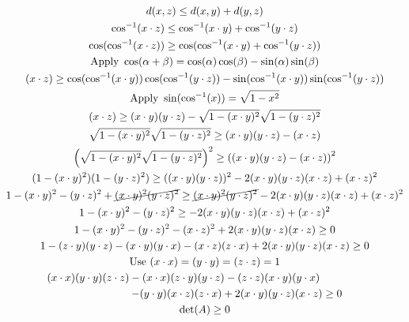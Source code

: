 \documentclass{jhwhw}
\begin{document}
\begin{gather}
d(x,z)\le d(x,y)+d(y,z)\\
\cos^{-1}(x\cdot z) \le \cos^{-1}(x\cdot y) + \cos^{-1}(y\cdot z)\\
\cos(\cos^{-1}(x\cdot z)) \ge \cos(\cos^{-1}(x\cdot y) + \cos^{-1}(y\cdot z))\\
\text{Apply } \cos(\alpha+\beta) = \cos(\alpha)\cos(\beta)-\sin(\alpha)\sin(\beta)\\
(x\cdot z) \ge \cos(\cos^{-1}(x\cdot y))\cos(\cos^{-1}(y\cdot z))-\sin(\cos^{-1}(x\cdot y))\sin(\cos^{-1}(y\cdot z))\\
\text{Apply } \sin(\cos^{-1}(x)) = \sqrt{ 1 -x^2}\\
(x\cdot z) \ge (x\cdot y)(y\cdot z)-\sqrt{ 1 -(x\cdot y)^2}\sqrt{ 1 -(y\cdot z)^2}\\
\sqrt{ 1 -(x\cdot y)^2}\sqrt{ 1 -(y\cdot z)^2} \ge (x\cdot y)(y\cdot z)-(x\cdot z)\\
\left(\sqrt{ 1 -(x\cdot y)^2}\sqrt{ 1 -(y\cdot z)^2}\right)^2 \ge \left((x\cdot y)(y\cdot z)-(x\cdot z)\right)^2\\
( 1 -(x\cdot y)^2)(1 -(y\cdot z)^2) \ge ((x\cdot y)(y\cdot z))^2-2(x\cdot y)(y\cdot z)(x\cdot z)+(x\cdot z)^2\\
1 -(x\cdot y)^2-(y\cdot z)^2 + \cancel{(x\cdot y)^2(y\cdot z)^2} \ge \cancel{(x\cdot y)^2(y\cdot z)^2}-2(x\cdot y)(y\cdot z)(x\cdot z)+(x\cdot z)^2\\
1 -(x\cdot y)^2-(y\cdot z)^2  \ge -2(x\cdot y)(y\cdot z)(x\cdot z)+(x\cdot z)^2\\
1 -(x\cdot y)^2-(y\cdot z)^2-(x\cdot z)^2 + 2(x\cdot y)(y\cdot z)(x\cdot z) \ge 0\\
1-(z\cdot y)(y\cdot z) - (x\cdot y)(y\cdot x) - (x\cdot z)(z\cdot x) + 2 (x\cdot y)(y\cdot z)(x\cdot z) \ge 0\\
\text{Use } (x\cdot x)=(y\cdot y)=(z\cdot z)=1\\
(x\cdot x)(y\cdot y)(z\cdot z) -(x\cdot x)(z\cdot y)(y\cdot z) - (z\cdot z)(x\cdot y)(y\cdot x)  \qquad\qquad\nonumber\\
\qquad\qquad\qquad -(y\cdot y)(x\cdot z)(z\cdot x) + 2 (x\cdot y)(y\cdot z)(x\cdot z) \ge 0\\
\det(A) \ge 0
\end{gather}
\end{document}
